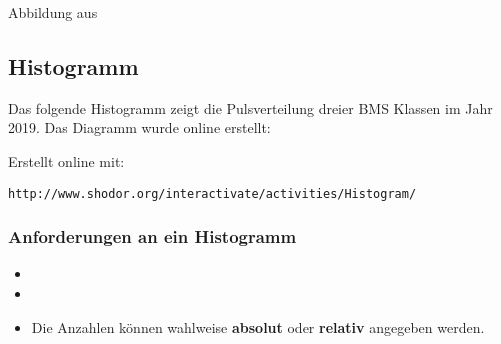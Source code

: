 
Abbildung aus \cite{marthaler21alg}
\newpage




\subsection{Histogramm}

Das folgende Histogramm zeigt die Pulsverteilung dreier BMS Klassen im Jahr 2019. Das Diagramm wurde online erstellt:


Erstellt online mit:

\texttt{http://www.shodor.org/interactivate/activities/Histogram/}

\newpage


\subsubsection{Anforderungen an ein Histogramm}
\begin{itemize}
\item {}
  \vspace{8mm}
\item {}
  \vspace{8mm}
  \item Die Anzahlen können wahlweise \textbf{absolut} oder
    \textbf{relativ} angegeben werden.
\end{itemize}

